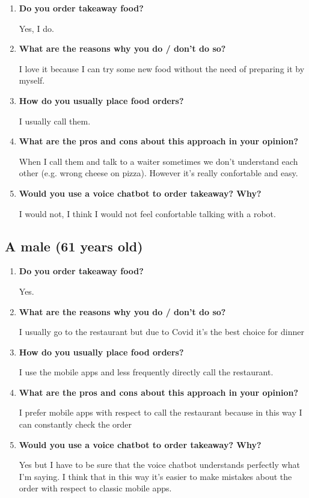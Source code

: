 \begin{enumerate}

\item \textbf{Do you order takeaway food?}

Yes, I do.

\item \textbf{What are the reasons why you do / don't do so?}

I love it because I can try some new food without the need of preparing it by myself.

\item \textbf{How do you usually place food orders?}

I usually call them.

\item \textbf{What are the pros and cons about this approach in your opinion?}

When I call them and talk to a waiter sometimes we don't understand each other (e.g. wrong cheese on pizza). However it's really confortable and easy.

\item \textbf{Would you use a voice chatbot to order takeaway? Why?}

I would not, I think I would not feel confortable talking with a robot.

\end{enumerate}


\subsection*{A male (61 years old)}

\begin{enumerate}

\item \textbf{Do you order takeaway food?}

Yes.

\item \textbf{What are the reasons why you do / don't do so?}

I usually go to the restaurant but due to Covid it's the best choice for dinner

\item \textbf{How do you usually place food orders?}

I use the mobile apps and less frequently directly call the restaurant.

\item \textbf{What are the pros and cons about this approach in your opinion?}

I prefer mobile apps with respect to call the restaurant because in this way I can constantly check the order

\item \textbf{Would you use a voice chatbot to order takeaway? Why?}

Yes but I have to be sure that the voice chatbot understands perfectly what I'm saying. I think that in this way it's easier to make mistakes about the order with respect to classic mobile apps.

\end{enumerate}

